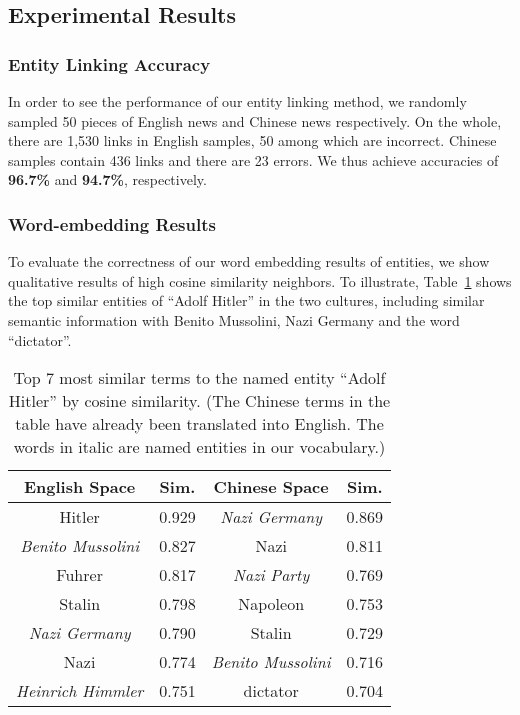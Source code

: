 \subsection{Experimental Results}


\subsubsection{Entity Linking Accuracy}

In order to see the performance of our entity linking method, we randomly sampled 50 pieces of English news and Chinese news respectively.
On the whole, there are 1,530 links in English samples, 50 among which are incorrect. Chinese samples contain 436 links and there are
23 errors. We thus achieve accuracies of \textbf{96.7\%} and \textbf{94.7\%},
respectively.

\subsubsection{Word-embedding Results}

To evaluate the correctness of our word embedding results of entities, we
show qualitative results of high cosine similarity neighbors.
To illustrate, Table~\ref{tbl:embd} shows the top similar entities of
``Adolf Hitler'' in the two cultures, including
similar semantic information with Benito Mussolini, Nazi Germany and the word ``dictator''.

\begin{table}[th]
\small
\centering
\caption{Top 7 most similar terms to the named entity ``Adolf Hitler'' by cosine similarity. (The Chinese terms in the table have already been translated into English. The words in italic are named entities in our vocabulary.) }
\label{tbl:embd}
\begin{tabular}{|c|c||c|c|}
\hline
\textbf{English Space} & \textbf{Sim.} & \textbf{Chinese Space} &
\textbf{Sim.}\\ \hline\hline
Hitler & 0.929 & \em{Nazi Germany}  & 0.869 \\ \hline
\em{Benito Mussolini} & 0.827 & Nazi  & 0.811 \\ \hline
Fuhrer & 0.817 & \em{Nazi Party}  & 0.769 \\ \hline

Stalin & 0.798 & Napoleon  & 0.753 \\ \hline
\em{Nazi Germany} & 0.790 & Stalin  & 0.729 \\ \hline
Nazi & 0.774 & \em{Benito Mussolini}  & 0.716 \\ \hline
\em{Heinrich Himmler} & 0.751 & dictator  & 0.704 \\ \hline
\end{tabular}
\end{table}

